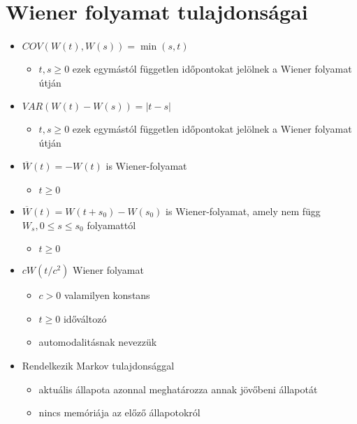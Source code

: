 \documentclass[11pt,a4pape,draftr]{article}
\begin{document}
			\section{Wiener folyamat tulajdonságai}
				\paragraph{}
					\begin{itemize}
						  \item $COV(W(t), W(s)) = \min(s,t)$
						  \begin{itemize}
						   	\item $t,s \ge 0$ ezek egymástól független időpontokat jelölnek a Wiener folyamat útján
						  \end{itemize}
						  \item $VAR(W(t)-W(s))=|t-s|$
						  \begin{itemize}
						  	\item $t,s \ge 0$ ezek egymástól független időpontokat jelölnek a Wiener folyamat útján
						  \end{itemize}
						  \item $\overline{W}(t) = -W(t)$ is Wiener-folyamat
						  \begin{itemize}
						  	\item $t \ge 0$
						  \end{itemize}
						  \item $\overline{W}(t) = W(t+s_0) - W(s_0)$ is Wiener-folyamat, amely nem függ $W_s, 0 \le s \le s_0$ folyamattól
						  \begin{itemize}
						  	\item $t \ge 0$
						  \end{itemize}
						  \item $cW(t/c^2)$ Wiener folyamat
						  \begin{itemize}
						  	\item $c > 0$ valamilyen konstans
						  	\item $t \ge 0$ időváltozó
						  	\item automodalitásnak nevezzük
						  \end{itemize}
						  \item Rendelkezik Markov tulajdonsággal
						  \begin{itemize}
						 	  \item aktuális állapota azonnal meghatározza annak jövőbeni állapotát
						  	 \item nincs memóriája az előző állapotokról
						  \end{itemize}
					\end{itemize}
\end{document}
